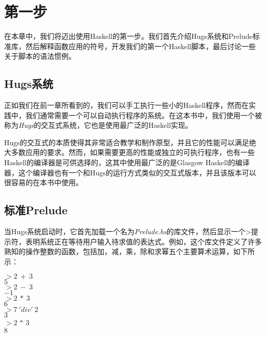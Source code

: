 \chapter{第一步}

在本章中，我们将迈出使用Haskell的第一步。我们首先介绍Hugs系统和Prelude标准库，然后解释函数应用的符号，开发我们的第一个Haskell脚本，最后讨论一些关于脚本的语法惯例。

\section{Hugs系统}
正如我们在前一章所看到的，我们可以手工执行一些小的Haskell程序，然而在实践中，我们通常需要一个可以自动执行程序的系统。在这本书中，我们使用一个被称为\textit{Hugs}的交互式系统，它也是使用最广泛的Haskell实现。

Hugs的交互式的本质使得其非常适合教学和制作原型，并且它的性能可以满足绝大多数应用的要求。然而，如果需要更高的性能或独立的可执行程序，也有一些Haskell的编译器是可供选择的，这其中使用最广泛的是Glasgow
Haskell的编译器，这个编译器也有一个和Hugs的运行方式类似的交互式版本，并且该版本可以很容易的在本书中使用。

\section{标准Prelude}

当Hugs系统启动时，它首先加载一个名为\textit{Prelude.hs}的库文件，然后显示一个>提示符，表明系统正在等待用户输入待求值的表达式。例如，这个库文件定义了许多熟知的操作整数的函数，包括加，减，乘，除和求幂五个主要算术运算，如下所示：

\noindent\hspace*{1cm} $>2~+~3$\\
\hspace*{1cm} $5$\\
\hspace*{1cm} $> 2~-~3$\\
\hspace*{1cm} $-1$\\
\hspace*{1cm} $> 2~*~3$\\
\hspace*{1cm} $6$\\
\hspace*{1cm} $> 7~'div'~2$\\
\hspace*{1cm} $3$\\
\hspace*{1cm} $> 2$ \verb|^| $3$\\
\hspace*{1cm} $8$

